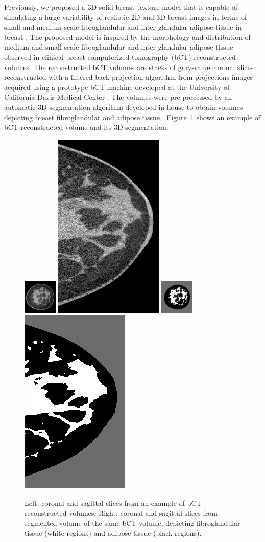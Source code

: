 \documentclass[journal]{IEEEtran}
\begin{document}
Previously, we proposed a 3D solid breast texture model that is
capable of simulating a large variability of realistic 2D and 3D
breast images in terms of small and medium scale fibroglandular and
inter-glandular adipose tissue in breast \cite{li2016novel}. The
proposed model is inspired by the morphology and distribution of
medium and small scale fibroglandular and inter-glandular adipose
tissue observed in clinical breast computerized tomography (bCT)
reconstructed volumes. The reconstructed bCT volumes are stacks of
gray-value coronal slices reconstructed with a filtered
back-projection algorithm from projections images acquired using a
prototype bCT machine developed at the University of California Davis
Medical Center \cite{lindfors2008dedicated}. The volumes were
pre-processed by an automatic 3D segmentation algorithm developed
in-house to obtain volumes depicting breast fibroglandular and adipose
tissue \cite{thomas2015segmentation}. Figure~\ref{fig:bct-ims} shows
an example of bCT reconstructed volume and its 3D segmentation.

\begin{figure}[!htbp]
  \centering
  \includegraphics[width=0.145\textwidth]{gray-cor-small}%
  \includegraphics[height=0.145\textwidth]{gray-sag-small}%
  \hspace{2mm}%
  \includegraphics[width=0.145\textwidth]{seg-cor-small}%
  \includegraphics[height=0.145\textwidth]{seg-sag-small}

  \caption{Left: coronal and sagittal slices from an example of bCT
    reconstructed volumes. Right: coronal and sagittal slices from
    segmented volume of the same bCT volume, depicting fibroglandular
    tissue (white regions) and adipose tissue (black regions).}
  \label{fig:bct-ims}
\end{figure}
\end{document}
